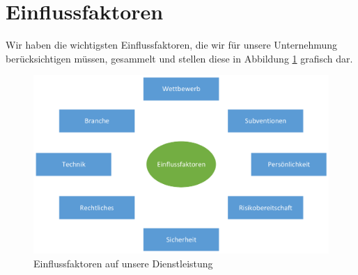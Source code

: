 \section{Einflussfaktoren}

Wir haben die wichtigsten Einflussfaktoren, die wir für unsere Unternehmung berücksichtigen müssen, gesammelt und stellen diese in Abbildung \ref{fig:Einflussfaktoren} grafisch dar.
	
\begin{figure}[H]
\centering
\includegraphics[width=1.0\linewidth]{Bilder/Einflussfaktoren}
\caption{Einflussfaktoren auf unsere Dienstleistung}
\label{fig:Einflussfaktoren}
\end{figure}


